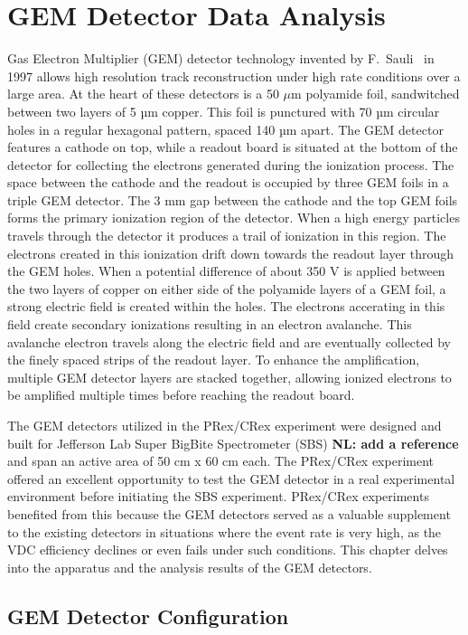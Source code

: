 \chapter{GEM Detector Data Analysis}
Gas Electron Multiplier (GEM) detector technology invented by F.~Sauli~\cite{Sauli} in 1997 allows  high resolution track reconstruction under high rate conditions over a large area.  At the heart of these detectors is a 50 $\mu$m polyamide foil, sandwitched between two layers of 5 µm copper.  This foil is punctured with 70 µm circular holes in a regular hexagonal pattern, spaced 140 µm apart. The GEM detector  features a cathode on top, while a readout board is situated  at the bottom of the detector  for collecting the electrons generated during the ionization process. The space between the cathode and the readout is occupied by three GEM foils 
 in a triple GEM detector. The 3 mm gap between the cathode and the top GEM foils forms the primary  ionization region of the detector. When a high energy particles travels through the detector it produces a trail of ionization in this region. The electrons created in this ionization drift down towards the readout layer through the GEM holes. When a potential difference of about  350 V is applied between the two layers of copper on either side of the polyamide layers of a GEM foil,    a strong  electric field is created  within the holes.  The electrons accerating in this field create secondary ionizations  resulting  in an electron avalanche. This avalanche electron travels along the electric field and are  eventually collected by the finely spaced strips of the readout layer. To enhance the amplification, multiple GEM detector layers are stacked together, allowing ionized electrons to be amplified multiple times before reaching the readout board.

The GEM detectors utilized in the PRex/CRex experiment were  designed  and built for Jefferson Lab Super BigBite Spectrometer (SBS) {\bf NL: add a reference} and span an active area of 50 cm x 60 cm each.  The PRex/CRex experiment offered an excellent opportunity to test the GEM detector in a real experimental environment before initiating the SBS experiment. PRex/CRex experiments benefited from this because the GEM detectors served as a valuable supplement to the existing detectors in situations where the event rate is very high, as the VDC efficiency declines or even fails under such conditions. This chapter delves into the apparatus and the analysis results of the GEM detectors.

\section{GEM Detector Configuration}

